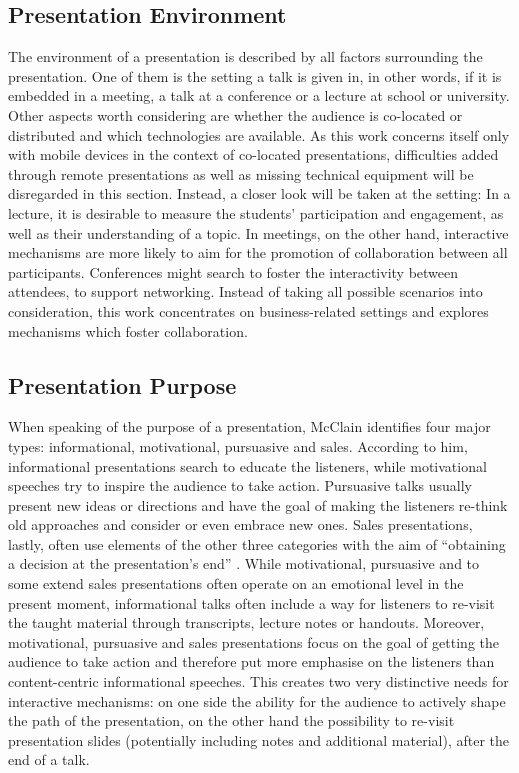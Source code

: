 \subsection{Presentation Environment}
The environment of a presentation is described by all factors surrounding the presentation. One of them is the setting a talk is given in, in other words, if it is embedded in a meeting, a talk at a conference or a lecture at school or university. Other aspects worth considering are whether the audience is co-located or distributed and which technologies are available. As this work concerns itself only with mobile devices in the context of co-located presentations, difficulties added through remote presentations as well as missing technical equipment will be disregarded in this section. Instead, a closer look will be taken at the setting: In a lecture, it is desirable to measure the students' participation and engagement, as well as their understanding of a topic. In meetings, on the other hand, interactive mechanisms are more likely to aim for the promotion of collaboration between all participants. Conferences might search to foster the interactivity between attendees, to support networking. Instead of taking all possible scenarios into consideration, this work concentrates on business-related settings and explores mechanisms which foster collaboration.

\subsection{Presentation Purpose}
When speaking of the purpose of a presentation, McClain \cite{McClain:TypeOfPresentations} identifies four major types: informational, motivational, pursuasive and sales. According to him, informational presentations search to educate the listeners, while motivational speeches try to inspire the audience to take action. Pursuasive talks usually present new ideas or directions and have the goal of making the listeners re-think old approaches and consider or even embrace new ones. Sales presentations, lastly, often use elements of the other three categories with the aim of ``obtaining a decision at the presentation's end'' \cite{McClain:TypeOfPresentations}. While motivational, pursuasive and to some extend sales presentations often operate on an emotional level in the present moment, informational talks often include a way for listeners to re-visit the taught material through transcripts, lecture notes or handouts. Moreover, motivational, pursuasive and sales presentations focus on the goal of getting the audience to take action and therefore put more emphasise on the listeners than content-centric informational speeches. This creates two very distinctive needs for interactive mechanisms: on one side the ability for the audience to actively shape the path of the presentation, on the other hand the possibility to re-visit presentation slides (potentially including notes and additional material), after the end of a talk.

